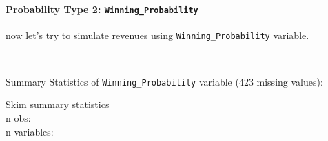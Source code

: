 \documentclass[]{article}
\newenvironment{Shaded}{\begin{snugshade}}{\end{snugshade}}
\newcommand{\KeywordTok}[1]{\textcolor[rgb]{0.13,0.29,0.53}{\textbf{#1}}}
\newcommand{\NormalTok}[1]{#1}
\newcommand{\OperatorTok}[1]{\textcolor[rgb]{0.81,0.36,0.00}{\textbf{#1}}}
\newcommand{\StringTok}[1]{\textcolor[rgb]{0.31,0.60,0.02}{#1}}
\let\oldparagraph\paragraph
\renewcommand{\paragraph}[1]{\oldparagraph{#1}\mbox{}}
\begin{document}
~

\hypertarget{probability-type-2-winning_probability}{%
\paragraph{\texorpdfstring{Probability Type 2:
\texttt{Winning\_Probability}}{Probability Type 2: Winning\_Probability}}\label{probability-type-2-winning_probability}}

now let's try to simulate revenues using \texttt{Winning\_Probability}
variable.

~

Summary Statistics of \texttt{Winning\_Probability} variable (423
missing values):

\begin{Shaded}
\end{Shaded}

Skim summary statistics\\
n obs:\\
n variables:
\end{document}
